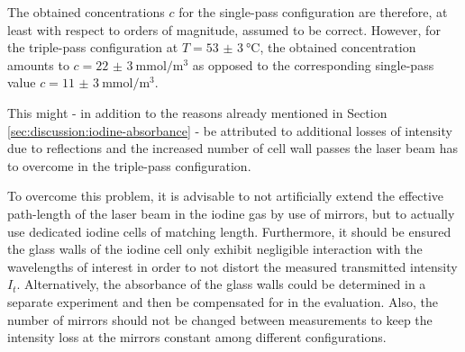 The obtained concentrations $c$ for the single-pass configuration are therefore, at least with respect to orders of magnitude, assumed to be correct. However, for the triple-pass configuration at $T = \SI{53(3)}{\celsius}$, the obtained concentration amounts to $c = \SI{22(3)}{\milli\mol\per\m^3}$ as opposed to the corresponding single-pass value $c = \SI{11(3)}{\milli\mol\per\m^3}$.

This might - in addition to the reasons already mentioned in Section \ref{sec:discussion:iodine-absorbance} - be attributed to additional losses of intensity due to reflections and the increased number of cell wall passes the laser beam has to overcome in the triple-pass configuration.

To overcome this problem, it is advisable to not artificially extend the effective path-length of the laser beam in the iodine gas by use of mirrors, but to actually use dedicated iodine cells of matching length. Furthermore, it should be ensured the glass walls of the iodine cell only exhibit negligible interaction with the wavelengths of interest in order to not distort the measured transmitted intensity $I_t$. Alternatively, the absorbance of the glass walls could be determined in a separate experiment and then be compensated for in the evaluation. Also, the number of mirrors should not be changed between measurements to keep the intensity loss at the mirrors constant among different configurations.



